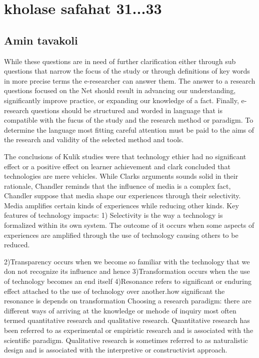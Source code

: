 \documentclass [12pt]{beamer}
\begin{document}
\section*{kholase safahat 31...33}
\subsection*{Amin tavakoli}	
\begin{frame}

\justifying
	
While these questions are in need of further clarification either through sub questions that narrow the focus of the study or through definitions of key words in more precise terms the e-researcher can answer them. The answer to a research questions focused on the Net should result in advancing our understanding, significantly improve practice, or expanding our knowledge of a fact. Finally, e-research questions should be structured and worded in language that is compatible with the fucus of the study and the research method or paradigm. To determine the language most fitting careful attention must be paid to the aims of the research and validity of the selected method and tools.

\end{frame}

\begin{frame}

\justifying
	
The conclusions of Kulik studies were that technology ethier had no significant effect or a positive effect on learner achievement and clark concluded that technologies are mere vehicles. While Clarks arguments sounds solid in their rationale, Chandler reminds that the influence of media is a complex fact, Chandler suppose that media shape our experiences through their selectivity. Media amplifies certain kinds of experiences while reducing other kinds. Key features of technology impacts:	1) Selectivity is the way a technology is formalized within its own system. The outcome of it occurs when some aspects of experiences are amplified through the use of technology causing others to be reduced.

\end{frame}

\begin{frame}

\justifying
	
2)Transparency occurs when we become so familiar with the technology that we don not recognize its influence and hence	3)Transformation occurs when the use of technology becomes an end itself	4)Resonance refers to significant or enduring effect attached to the use of technology over another.how significant the resonance is depends on transformation Choosing a research paradigm: there are different ways of arriving at the knowledge or mehode of inquiry most often termed quantitative research and qualitative research. Quantitative research has been referred to as experimental or empiristic research and is associated with the scientific paradigm. Qualitative research is sometimes referred to as naturalistic design and is associated with the interpretive or constructivist approach.

\end{frame}
\end{document}
